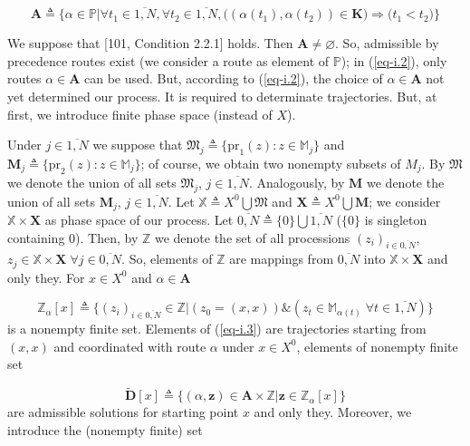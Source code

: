 \documentclass{article}
\begin{document}
\begin{equation*}
  \mathbf A \triangleq
  \{ \alpha \in \mathbb P |
  \forall t_1 \in \overline{1,N},
  \forall t_2 \in \overline{1,N},
  \big(
    (\alpha(t_1), \alpha(t_2)) \in \mathbf K
  \big)
  \Rightarrow
  \big(t_1 < t_2 \big)
\}
\end{equation*}

We suppose that
[101, Condition 2.2.1]  %
holds.
Then
$\mathbf A \neq \varnothing$.
So,
admissible by precedence routes exist
(we consider a route as element of
$\mathbb P$);
in (\ref{eq-i.2}),
only routes
$\alpha \in \mathbf A$
can be used.
But, according to (\ref{eq-i.2}),
the choice of
$\alpha \in \mathbf A$
not yet determined our process.
It is required to determinate trajectories.
But, at first,
we introduce finite phase space
(instead of $X$).

Under
$j \in \overline{1, N}$
we suppose that
$
\mathfrak M_j \triangleq
\{\mathrm{pr}_1(z): z \in \mathbb M_j \}
$
and
$
\mathbf M_j \triangleq
\{ \mathrm{pr}_2(z): z \in \mathbb M_j \}
$;
of course,
we obtain two nonempty subsets of
$M_j$.
By
$\mathfrak M$
we denote the union of all sets
$\mathfrak M_j$,
$j \in \overline{1,N}$.
Analogously,
by
$\mathbf M$
we denote the union of all sets
$\mathbf M_j$,
$j \in \overline{1,N}$.
Let
$\mathbb X \triangleq
X^0 \bigcup \mathfrak M$
and
$
\mathbf X \triangleq
X^0 \bigcup \mathbf M
$;
we consider
$\mathbb X \times \mathbf X$
as phase space of our process.
Let
$\overline{0, N} \triangleq \{0\} \bigcup \overline{1,N}$
($\{0\}$ is singleton containing 0).
Then, by
$\mathbb Z$
we denote the set of all processions
$(z_i)_{i\in\overline{0,N}}$,
$z_j \in \mathbb X \times \mathbf X
\; \forall j \in \overline{0,N}$.
So, elements of
$\mathbb Z$
are mappings from
$\overline{0,N}$
into
$\mathbb X \times \mathbf X$
and only they.
For
$x \in X^0$
and
$\alpha \in \mathbf A$

\begin{equation}
  \label{eq-i.3}
  \mathbb Z_\alpha[x] \triangleq
  \{(z_i)_{i \in \overline{0,N}} \in \mathbb Z
  |
  (z_0 =(x,x))
  \&
  (z_t \in \mathbb M_{\alpha(t)}
  \;\forall t \in \overline{1,N})
  \}
\end{equation}
is a nonempty finite set.
Elements of (\ref{eq-i.3})
are trajectories starting from
$(x,x)$
and coordinated with route
$\alpha$
under
$x \in X^0$,
elements of nonempty finite set

\begin{equation}
  \label{eq-i.4}
\tilde {\mathbf D}[x] \triangleq
\{
  (\alpha,\mathbf z) \in \mathbf A \times \mathbb Z
|
  \mathbf z \in \mathbb Z_\alpha[x]
\}
\end{equation}
are admissible solutions for starting point
$x$
and only they.
Moreover,
we introduce the
(nonempty finite)
set
\end{document}
